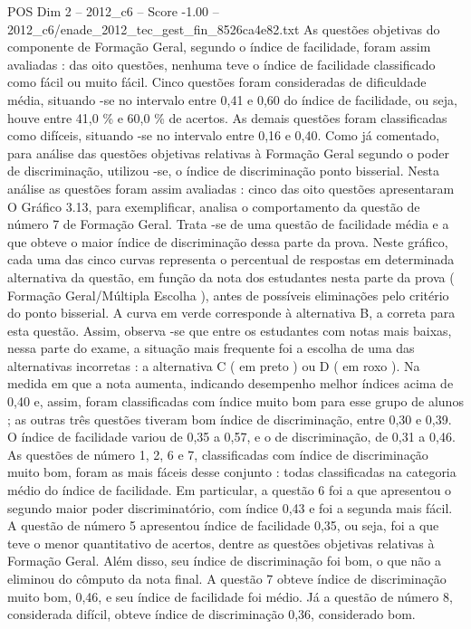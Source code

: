 \begin{textsample}{POS Dim 2 – 2012\_c6 – Score -1.00 – 2012\_c6/enade\_2012\_tec\_gest\_fin\_8526ca4e82.txt}
As questões objetivas do componente de Formação Geral, segundo o índice de facilidade, foram assim avaliadas : das oito questões, nenhuma teve o índice de facilidade classificado como fácil ou muito fácil.
Cinco questões foram consideradas de dificuldade média, situando -se no intervalo entre 0,41 e 0,60 do índice de facilidade, ou seja, houve entre 41,0 \% e 60,0 \% de acertos.
As demais questões foram classificadas como difíceis, situando -se no intervalo entre 0,16 e 0,40.
Como já comentado, para análise das questões objetivas relativas à Formação Geral segundo o poder de discriminação, utilizou -se, o índice de discriminação ponto bisserial.
Nesta análise as questões foram assim avaliadas : cinco das oito questões apresentaram O Gráfico 3.13, para exemplificar, analisa o comportamento da questão de número 7 de Formação Geral.
Trata -se de uma questão de facilidade média e a que obteve o maior índice de discriminação dessa parte da prova.
Neste gráfico, cada uma das cinco curvas representa o percentual de respostas em determinada alternativa da questão, em função da nota dos estudantes nesta parte da prova ( Formação Geral/Múltipla Escolha ), antes de possíveis eliminações pelo critério do ponto bisserial.
A curva em verde corresponde à alternativa B, a correta para esta questão.
Assim, observa -se que entre os estudantes com notas mais baixas, nessa parte do exame, a situação mais frequente foi a escolha de uma das alternativas incorretas : a alternativa C ( em preto ) ou D ( em roxo ).
Na medida em que a nota aumenta, indicando desempenho melhor índices acima de 0,40 e, assim, foram classificadas com índice muito bom para esse grupo de alunos ; as outras três questões tiveram bom índice de discriminação, entre 0,30 e 0,39.
O índice de facilidade variou de 0,35 a 0,57, e o de discriminação, de 0,31 a 0,46.
As questões de número 1, 2, 6 e 7, classificadas com índice de discriminação muito bom, foram as mais fáceis desse conjunto : todas classificadas na categoria médio do índice de facilidade.
Em particular, a questão 6 foi a que apresentou o segundo maior poder discriminatório, com índice 0,43 e foi a segunda mais fácil.
A questão de número 5 apresentou índice de facilidade 0,35, ou seja, foi a que teve o menor quantitativo de acertos, dentre as questões objetivas relativas à Formação Geral.
Além disso, seu índice de discriminação foi bom, o que não a eliminou do cômputo da nota final.
A questão 7 obteve índice de discriminação muito bom, 0,46, e seu índice de facilidade foi médio.
Já a questão de número 8, considerada difícil, obteve índice de discriminação 0,36, considerado bom.

\end{textsample}

